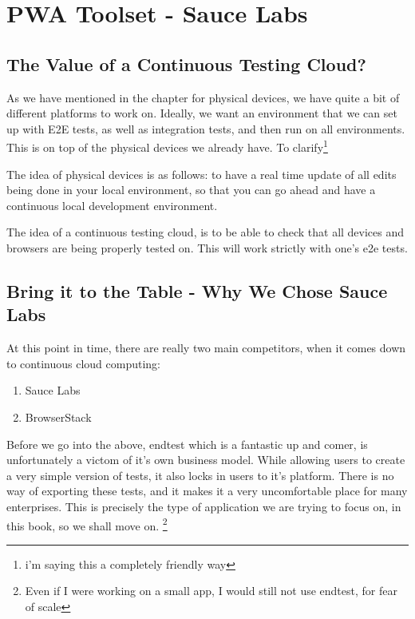
\section{ PWA Toolset - Sauce Labs }

\subsection{ The Value of a Continuous Testing Cloud? }

As we have mentioned in the chapter for physical devices, we have quite a bit of
different platforms to work on. Ideally, we want an environment that we can set
up with E2E tests, as well as integration tests, and then run on all environments.
This is on top of the physical devices we already have. To clarify\footnote{i'm saying this a completely friendly way}

The idea of physical devices is as follows: to have a real time update of all
edits being done in your local environment, so that you can go ahead and have a
continuous local development environment.

The idea of a continuous testing cloud, is to be able to check that all devices
and browsers are being properly tested on. This will work strictly with one's
e2e tests.

\subsection{ Bring it to the Table - Why We Chose Sauce Labs }

At this point in time, there are really two main competitors, when it comes
down to continuous cloud computing:

\begin{enumerate}
  \item Sauce Labs
  \item BrowserStack
\end{enumerate}

Before we go into the above, endtest which is a fantastic up and comer, is
unfortunately a victom of it's own business model. While allowing users to
create a very simple version of tests, it also locks in users to it's platform.
There is no way of exporting these tests, and it makes it a very uncomfortable
place for many enterprises. This is precisely the type of application we are
trying to focus on, in this book, so we shall move on. \footnote{Even if I were
working on a small app, I would still not use endtest, for fear of scale}

